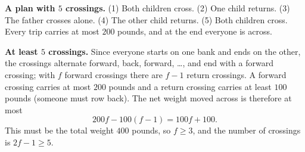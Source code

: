 \textbf{A plan with $5$ crossings.} (1) Both children cross. (2) One child returns. (3) The father crosses alone. (4) The other child returns. (5) Both children cross. Every trip carries at most $200$ pounds, and at the end everyone is across.

\textbf{At least $5$ crossings.} Since everyone starts on one bank and ends on the other, the crossings alternate forward, back, forward, \dots, and end with a forward crossing; with $f$ forward crossings there are $f-1$ return crossings. A forward crossing carries at most $200$ pounds and a return crossing carries at least $100$ pounds (someone must row back). The net weight moved across is therefore at most
\[
200f-100(f-1)=100f+100 .
\]
This must be the total weight $400$ pounds, so $f\ge3$, and the number of crossings is $2f-1\ge\boxed{5}$.
